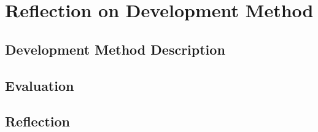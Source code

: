 \chapter{Reflection on Development Method}\label{chap:devmethodreflection}

\section{Development Method Description}

\section{Evaluation}

\section{Reflection}